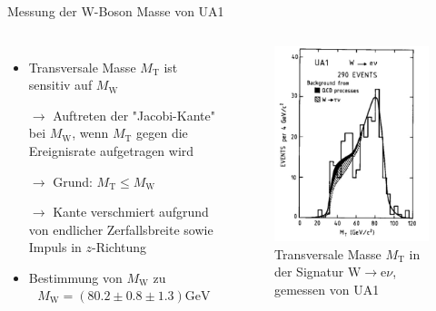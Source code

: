 \documentclass[aspectratio=1610, professionalfonts, 10pt]{beamer}
\begin{document}
\begin{frame}{Messung der W-Boson Masse von UA1}
	\begin{columns}
				\begin{itemize}
					\setlength\itemsep{0.5em}
					\vspace*{-20px}
					\item Transversale Masse $M_\text{T}$ ist sensitiv auf $M_\text{W}$
					\item[$\rightarrow$] Auftreten der "Jacobi-Kante" bei $M_\text{W}$, wenn $M_\text{T}$ gegen die Ereignisrate aufgetragen wird
					\item[$\rightarrow$] Grund: $M_\text{T} \leq M_\text{W}$
					\item[$\rightarrow$] Kante verschmiert aufgrund von endlicher Zerfallsbreite sowie Impuls in $z$-Richtung
					\item Bestimmung von $M_\text{W}$ zu \cite{doi:10.1142/9789814644150_0006}
					\begin{align*}
						M_\text{W} = \left( \num{80.2} \pm \num{0.8} \pm \num{1.3} \right)\si{\giga\electronvolt}
					\end{align*}
				\end{itemize}
			\begin{figure}
	  			\centering
				\includegraphics[width=0.7\linewidth]{Images/Screenshot_2018-12-05_16-22-51.png}
				\caption{Transversale Masse $M_\text{T}$ in der Signatur $\text{W} \rightarrow \text{e} \nu$, gemessen von UA1 \cite{doi:10.1142/9789814644150_0006}}
	  			\label{fig:sad}
			\end{figure}
	\end{columns}
\end{frame}


\end{document}
